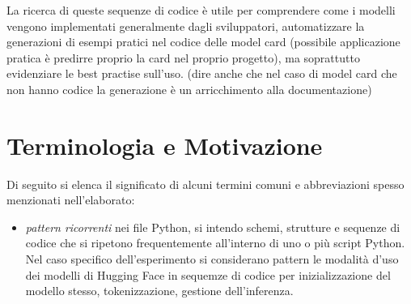 \documentclass{article}
\begin{document}
La ricerca di queste sequenze di codice è utile per comprendere come i modelli vengono implementati generalmente dagli sviluppatori, automatizzare la generazioni di esempi pratici nel codice delle model card (possibile applicazione pratica è predirre proprio la card nel proprio progetto), ma soprattutto evidenziare le best practise sull'uso.
(dire anche che nel caso di model card che non hanno codice la generazione è un arricchimento alla documentazione)


\section{Terminologia e Motivazione}
Di seguito si elenca il significato di alcuni termini comuni e abbreviazioni spesso menzionati nell'elaborato:
\begin{itemize}
    \item \textit{pattern ricorrenti} nei file Python, si intendo schemi, strutture e sequenze di codice che si ripetono frequentemente all'interno di uno o più script Python. Nel caso specifico dell'esperimento si considerano pattern le modalità d'uso dei modelli di Hugging Face in sequemze di codice per inizializzazione del modello stesso, tokenizzazione, gestione dell'inferenza.
\end{itemize}
\end{document}
